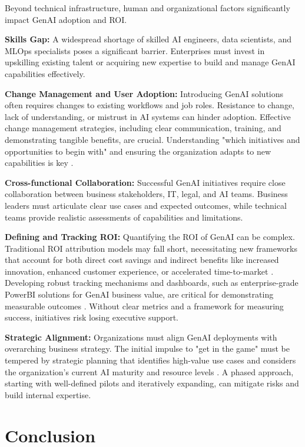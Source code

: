 \documentclass{article}
\begin{document}
Beyond technical infrastructure, human and organizational factors significantly impact GenAI adoption and ROI.

\textbf{Skills Gap:} A widespread shortage of skilled AI engineers, data scientists, and MLOps specialists poses a significant barrier. Enterprises must invest in upskilling existing talent or acquiring new expertise to build and manage GenAI capabilities effectively.

\textbf{Change Management and User Adoption:} Introducing GenAI solutions often requires changes to existing workflows and job roles. Resistance to change, lack of understanding, or mistrust in AI systems can hinder adoption. Effective change management strategies, including clear communication, training, and demonstrating tangible benefits, are crucial. Understanding "which initiatives and opportunities to begin with" and ensuring the organization adapts to new capabilities is key \cite{openalex_w4400993506}.

\textbf{Cross-functional Collaboration:} Successful GenAI initiatives require close collaboration between business stakeholders, IT, legal, and AI teams. Business leaders must articulate clear use cases and expected outcomes, while technical teams provide realistic assessments of capabilities and limitations.

\textbf{Defining and Tracking ROI:} Quantifying the ROI of GenAI can be complex. Traditional ROI attribution models may fall short, necessitating new frameworks that account for both direct cost savings and indirect benefits like increased innovation, enhanced customer experience, or accelerated time-to-market \cite{crossref_10_2139_ssrn_6374778}. Developing robust tracking mechanisms and dashboards, such as enterprise-grade PowerBI solutions for GenAI business value, are critical for demonstrating measurable outcomes \cite{github_ankitakapoor980_genai_roi_powerbi_dashboard}. Without clear metrics and a framework for measuring success, initiatives risk losing executive support.

\textbf{Strategic Alignment:} Organizations must align GenAI deployments with overarching business strategy. The initial impulse to "get in the game" must be tempered by strategic planning that identifies high-value use cases and considers the organization's current AI maturity and resource levels \cite{openalex_w4400993506}. A phased approach, starting with well-defined pilots and iteratively expanding, can mitigate risks and build internal expertise.


\section{Conclusion}
\end{document}
